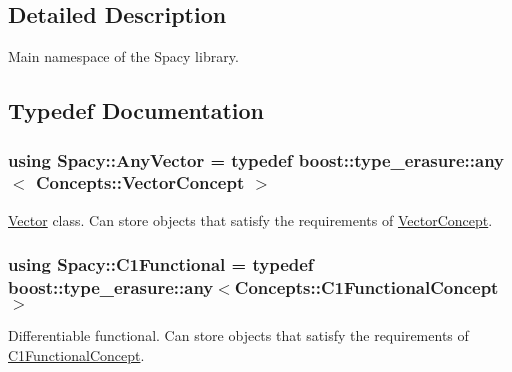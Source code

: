 \subsection{Detailed Description}
Main namespace of the Spacy library. 

\subsection{Typedef Documentation}
\hypertarget{group__SpacyGroup_gafc144d2730ef87a67e54f8cd750b1f54_gafc144d2730ef87a67e54f8cd750b1f54}{}
\subsubsection[{Any\+Vector}]{\setlength{\rightskip}{0pt plus 5cm}using {\bf Spacy\+::\+Any\+Vector} = typedef boost\+::type\+\_\+erasure\+::any$<$ {\bf Concepts\+::\+Vector\+Concept} $>$}\label{group__SpacyGroup_gafc144d2730ef87a67e54f8cd750b1f54_gafc144d2730ef87a67e54f8cd750b1f54}


\hyperlink{classSpacy_1_1Vector}{Vector} class. Can store objects that satisfy the requirements of \hyperlink{group__ConceptGroup_gad6958389d1fa2758a8a64a0a24c36004_VectorConceptAnchor}{Vector\+Concept}. 

\label{group__SpacyGroup_gafc144d2730ef87a67e54f8cd750b1f54_VectorAnchor}%
\hypertarget{group__SpacyGroup_gafc144d2730ef87a67e54f8cd750b1f54_VectorAnchor}{}%
\hypertarget{group__SpacyGroup_gaa7cb8ef6c287b0af0352d3dd0eb9f200_gaa7cb8ef6c287b0af0352d3dd0eb9f200}{}
\subsubsection[{C1\+Functional}]{\setlength{\rightskip}{0pt plus 5cm}using {\bf Spacy\+::\+C1\+Functional} = typedef boost\+::type\+\_\+erasure\+::any$<${\bf Concepts\+::\+C1\+Functional\+Concept}$>$}\label{group__SpacyGroup_gaa7cb8ef6c287b0af0352d3dd0eb9f200_gaa7cb8ef6c287b0af0352d3dd0eb9f200}


Differentiable functional. Can store objects that satisfy the requirements of \hyperlink{group__ConceptGroup_ga205b55d8291e0f2e143f116cf78bc54f_C1FunctionalConceptAnchor}{C1\+Functional\+Concept}. 

\label{group__SpacyGroup_gaa7cb8ef6c287b0af0352d3dd0eb9f200_C1FunctionalAnchor}%
\hypertarget{group__SpacyGroup_gaa7cb8ef6c287b0af0352d3dd0eb9f200_C1FunctionalAnchor}{}%
\hypertarget{group__SpacyGroup_ga87ae8cb0d7a567a4bb181e0a9f182620_ga87ae8cb0d7a567a4bb181e0a9f182620}{}
